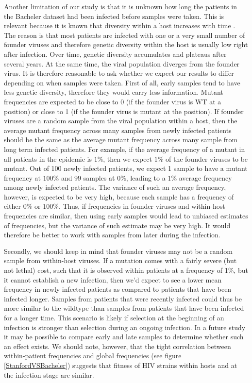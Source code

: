 \documentclass{article}
\begin{document}
Another limitation of our study is that it is unknown how long the patients in the Bacheler \cite{bacheler2000human} dataset had been infected before samples were taken. This is relevant because it is known that diversity within a host increases with time \cite{shankarappa1999consistent, kouyos2015irreversibility}. The reason is that most patients are infected with one or a very small number of founder viruses and therefore genetic diversity within the host is usually low right after infection. Over time, genetic diversity accumulates and plateaus after several years. At the same time, the viral population diverges from the founder virus. It is therefore reasonable to ask whether we expect our results to differ depending on when samples were taken. 
First of all, early samples tend to have less genetic diversity, therefore they would carry less information. Mutant frequencies are expected to be close to 0 (if the founder virus is WT at a position) or close to 1 (if the founder virus is mutant at the position). If founder viruses are a random sample from the viral population within a host, then the average mutant frequency across many samples from newly infected patients should be the same as the average mutant frequency across many sample from long term infected patients. For example, if the average frequency of a mutant in all patients in the epidemic is $1\%$, then we expect $1\%$ of the founder viruses to be mutant. Out of 100 newly infected patients, we expect 1 sample to have a mutant frequency at $100\%$ and 99 samples at $0\%$, leading to a $1\%$ average frequency among newly infected patients. The variance of such an average frequency, however, is expected to be very high, because each sample has a frequency of either $0\%$ or $100\%$. Thus, if frequencies in founder viruses and within-host frequencies are similar, then using early samples would lead to unbiased estimates of frequencies, but the variance of such estimate may be very high. It would therefore be better to work with samples from later during the infection. 

Secondly, we should keep in mind that founder viruses may not be a random sample from within-host viruses. If a mutation comes with a fairly severe (but not lethal) cost, such that it is observed within patients at a frequency of 1\%, but it cannot establish a new infection, then we’d expect to see a lower mean frequency in newly infected patients as compared to patients that have been infected longer. Samples from patients that were recently infected could thus be more similar to the wildtype than samples from patients that have been infected for a longer time. This scenario is likely if selection at the beginning of an infection is stronger than selection during an ongoing infection. In a future study it may be possible to compare early and late samples to determine whether such an effect exists. We should note, however, that the tight correlation between within-patient frequencies and global frequencies (see figure \ref{StanfordVSBacheler}) suggests that fitness of HIV strains within hosts and at the infection stage are similar. 
\end{document}

